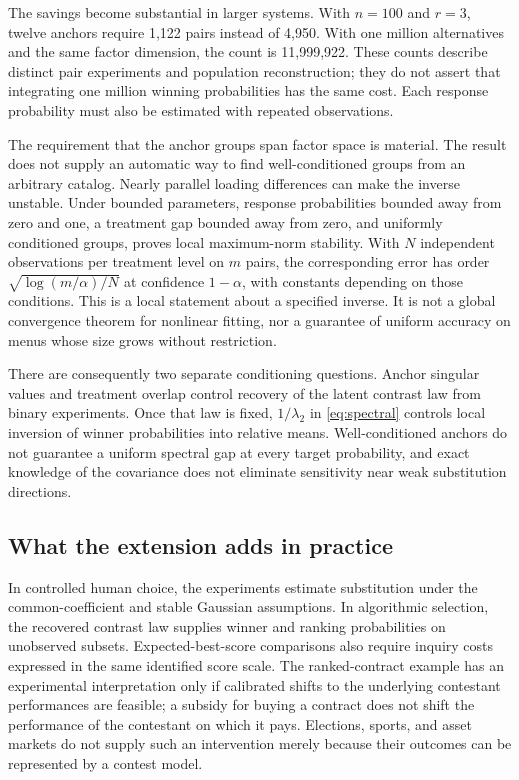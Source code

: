 \documentclass[11pt]{amsart}
\theoremstyle{definition}
\begin{document}
The savings become substantial in larger systems. With $n=100$ and $r=3$, twelve anchors require 1,122 pairs instead of 4,950. With one million alternatives and the same factor dimension, the count is 11,999,922. These counts describe distinct pair experiments and population reconstruction; they do not assert that integrating one million winning probabilities has the same cost. Each response probability must also be estimated with repeated observations.

The requirement that the anchor groups span factor space is material. The result does not supply an automatic way to find well-conditioned groups from an arbitrary catalog. Nearly parallel loading differences can make the inverse unstable. Under bounded parameters, response probabilities bounded away from zero and one, a treatment gap bounded away from zero, and uniformly conditioned groups, \cite{wuebben2026} proves local maximum-norm stability. With $N$ independent observations per treatment level on $m$ pairs, the corresponding error has order
$\sqrt{\log(m/\alpha)/N}$ at confidence $1-\alpha$, with constants depending on those conditions. This is a local statement about a specified inverse. It is not a global convergence theorem for nonlinear fitting, nor a guarantee of uniform accuracy on menus whose size grows without restriction.

There are consequently two separate conditioning questions. Anchor singular
values and treatment overlap control recovery of the latent contrast law
from binary experiments. Once that law is fixed, $1/\lambda_2$ in
\eqref{eq:spectral} controls local inversion of winner probabilities into
relative means. Well-conditioned anchors do not guarantee a uniform spectral
gap at every target probability, and exact knowledge of the covariance does
not eliminate sensitivity near weak substitution directions.

\subsection{What the extension adds in practice}
In controlled human choice, the experiments estimate substitution under the common-coefficient and stable Gaussian assumptions. In algorithmic selection, the recovered contrast law supplies winner and ranking probabilities on unobserved subsets. Expected-best-score comparisons also require inquiry costs expressed in the same identified score scale. The ranked-contract example has an experimental interpretation only if calibrated shifts to the underlying contestant performances are feasible; a subsidy for buying a contract does not shift the performance of the contestant on which it pays. Elections, sports, and asset markets do not supply such an intervention merely because their outcomes can be represented by a contest model.
\end{document}
